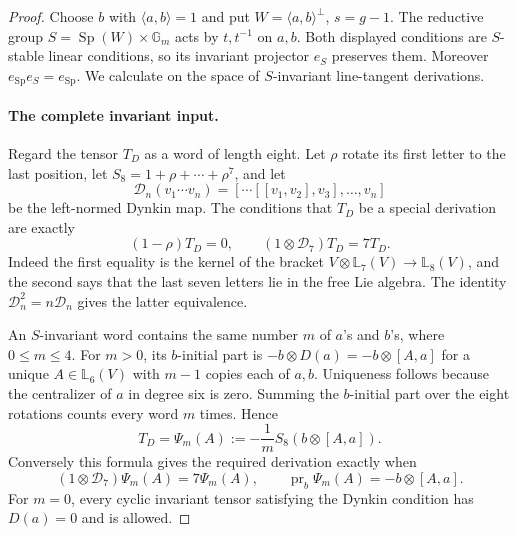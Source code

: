 \documentclass[11pt]{article}
\theoremstyle{definition}\newtheorem{definition}[theorem]{Definition}
\begin{document}
\begin{proof}
Choose $b$ with $\langle a,b\rangle=1$ and put
$W=\langle a,b\rangle^\perp$, $s=g-1$.
The reductive group $S=\operatorname{Sp}(W)\times\mathbb G_m$
acts by $t,t^{-1}$ on $a,b$. Both displayed conditions are
$S$-stable linear conditions, so its invariant projector
$e_S$ preserves them. Moreover
$e_{\operatorname{Sp}}e_S=e_{\operatorname{Sp}}$.
We calculate on the space of $S$-invariant line-tangent
derivations.

\paragraph{The complete invariant input.}
Regard the tensor $T_D$ as a word of length eight.
Let $\rho$ rotate its first letter to the last position,
let $S_8=1+\rho+\cdots+\rho^7$, and let
\[
 \mathcal D_n(v_1\cdots v_n)
       =[\cdots[[v_1,v_2],v_3],\ldots,v_n]
\]
be the left-normed Dynkin map. The conditions that $T_D$
be a special derivation are exactly
\[
 (1-\rho)T_D=0,\qquad
 (1\otimes\mathcal D_7)T_D=7T_D.
\]
Indeed the first equality is the kernel of the bracket
$V\otimes\mathbb L_7(V)\to\mathbb L_8(V)$, and the
second says that the last seven letters lie in the free
Lie algebra. The identity $\mathcal D_n^2=n\mathcal D_n$
gives the latter equivalence.

An $S$-invariant word contains the same number $m$ of
$a$'s and $b$'s, where $0\leq m\leq4$.
For $m>0$, its $b$-initial part is
$-b\otimes D(a)=-b\otimes[A,a]$ for a unique
$A\in\mathbb L_6(V)$ with $m-1$ copies each of $a,b$.
Uniqueness follows because the centralizer of $a$ in
degree six is zero. Summing the $b$-initial part over the
eight rotations counts every word $m$ times. Hence
\[
 T_D=\Psi_m(A):=-\frac1m S_8(b\otimes[A,a]).
\]
Conversely this formula gives the required derivation
exactly when
\begin{equation}\label{eq:line-input-constraints}
 (1\otimes\mathcal D_7)\Psi_m(A)=7\Psi_m(A),\qquad
 \operatorname{pr}_b\Psi_m(A)=-b\otimes[A,a].
\end{equation}
For $m=0$, every cyclic invariant tensor satisfying the
Dynkin condition has $D(a)=0$ and is allowed.


\end{proof}
\end{document}
